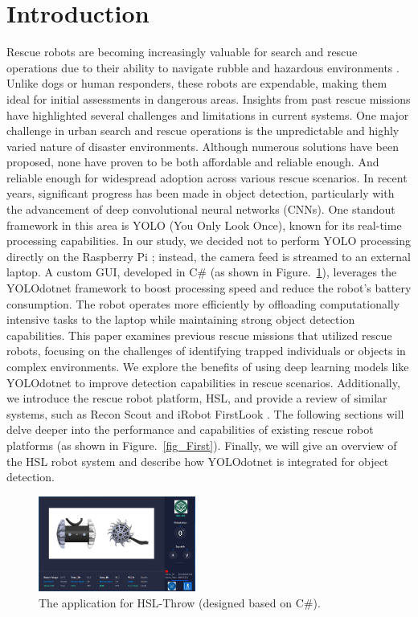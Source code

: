 \documentclass[conference]{IEEEtran}
\begin{document}
\section{Introduction}
Rescue robots are becoming increasingly valuable for search and rescue operations due to their ability to navigate rubble and hazardous environments \cite{Messina2007}. Unlike dogs or human responders, these robots are expendable, making them ideal for initial assessments in dangerous areas. Insights from past rescue missions have highlighted several challenges and limitations in current systems. One major challenge in urban search and rescue operations is the unpredictable and highly varied nature of disaster environments. Although numerous solutions have been proposed, none have proven to be both affordable and reliable enough. And reliable enough for widespread adoption across various rescue scenarios. In recent years, significant progress has been made in object detection, particularly with the advancement of deep convolutional neural networks (CNNs). One standout framework in this area is YOLO (You Only Look Once), known for its real-time processing capabilities. In our study, we decided not to perform YOLO processing directly on the Raspberry Pi \cite{Yao2022}; instead, the camera feed is streamed to an external laptop. A custom GUI, developed in C\# (as shown in Figure.~\ref{ThrowHSL_Software}), leverages the YOLOdotnet framework to boost processing speed and reduce the robot's battery consumption. The robot operates more efficiently by offloading computationally intensive tasks to the laptop while maintaining strong object detection capabilities. This paper examines previous rescue missions that utilized rescue robots, focusing on the challenges of identifying trapped individuals or objects in complex environments. We explore the benefits of using deep learning models like YOLOdotnet to improve detection capabilities in rescue scenarios.
Additionally, we introduce the rescue robot platform, HSL, and provide a review of similar systems, such as Recon Scout and iRobot FirstLook \cite{ReconRobotics_ScoutXL, ReconRobotics_ThrowbotXT}. The following sections will delve deeper into the performance and capabilities of existing rescue robot platforms (as shown in Figure.~\ref{fig_First}). Finally, we will give an overview of the HSL robot system and describe how YOLOdotnet is integrated for object detection.

\begin{figure}[htbp]
\centerline{\includegraphics[width=0.46\textwidth]{ThrowHSL_Software.PNG}}
\caption{The application for HSL-Throw (designed based on C\#).}
\label{ThrowHSL_Software}
\end{figure}
\end{document}
